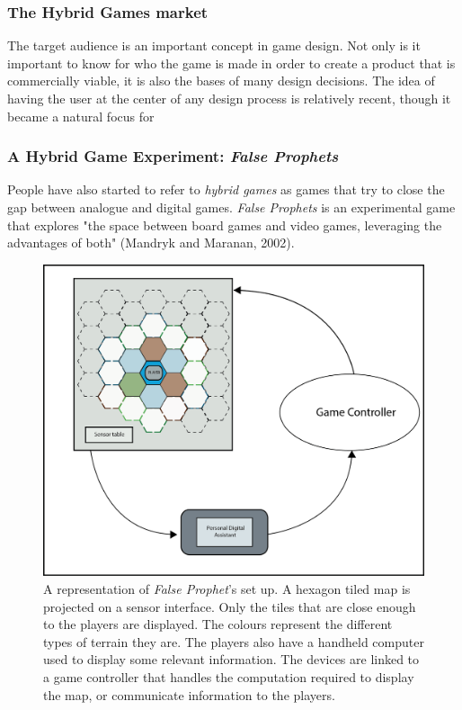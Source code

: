 \subsubsection{The Hybrid Games market}

The target audience is an important concept in game design. Not only is it important to know for who the game is made in order to create a product that is commercially viable, it is also the bases of many design decisions. The idea of having the user at the center of any design process is relatively recent, though it became a natural focus for

\subsubsection{A Hybrid Game Experiment: \textit{False Prophets}}
People have also started to refer to \textit{hybrid games} as games that try to close the gap between analogue and digital games. \textit{False Prophets} is an experimental game that explores "the space between board games and video games, leveraging the advantages of both" (Mandryk and Maranan, 2002)\cite{art:prophets}. 

\begin{figure}[h]
    \centering
    \includegraphics[scale=1]{Images/f_p_fig.png}
    \caption{A representation of \textit{False Prophet}'s set up. A hexagon tiled map is projected on a sensor interface. Only the tiles that are close enough to the players are displayed. The colours represent the different types of terrain they are. The players also have a handheld computer used to display some relevant information. The devices are linked to a game controller that handles the computation required to display the map, or communicate information to the players.}
    \label{fig:falseprophet}
\end{figure}

